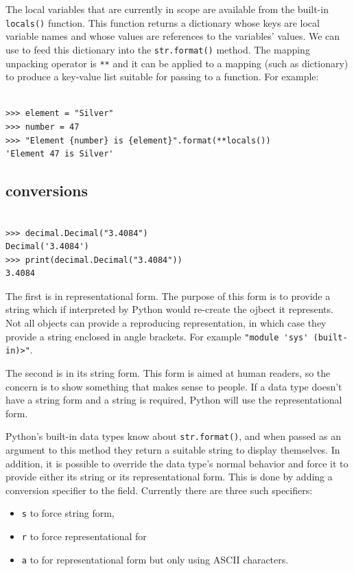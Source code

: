 The local variables that are currently in scope are available from the built-in \verb|locals()| function.
This function returns a dictionary whose keys are local variable names and whose values are references to the variables' values.
We can use  to feed this dictionary into the \verb|str.format()| method.
The mapping unpacking operator is \verb|**| and it can be applied to a mapping (such as dictionary) to produce a key-value list suitable for passing to a function.
For example:
\begin{lstlisting}

>>> element = "Silver"
>>> number = 47
>>> "Element {number} is {element}".format(**locals()) 
'Element 47 is Silver'
\end{lstlisting}




\subsection{conversions}

\begin{lstlisting}

>>> decimal.Decimal("3.4084") 
Decimal('3.4084')
>>> print(decimal.Decimal("3.4084")) 
3.4084
\end{lstlisting}


The first is in representational form.
The purpose of this form is to provide a string which if interpreted by Python would re-create the ojbect it represents.
Not all objects can provide a reproducing representation, in which case they provide a string enclosed in angle brackets.
For example \verb|"module 'sys' (built-in)>"|.

The second is in its string form.
This form is aimed at human readers, so the concern is to show something that makes sense to people.
If a data type doesn’t have a string form and a string is required, Python will use the representational form.


Python’s built-in data types know about \verb|str.format()|, and when passed as an argument to this method they return a suitable string to display themselves.
In addition, it is possible to override the data type’s normal behavior and force it to provide either its string or its representational form.
This is done by adding a conversion specifier to the field.
Currently there are three such specifiers:
\begin{itemize}
\item \verb|s| to force string form, 
\item \verb|r| to force representational for
\item \verb|a| to for representational form but only using ASCII characters.
\end{itemize}


